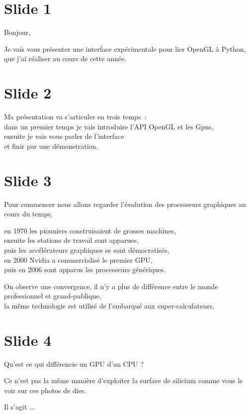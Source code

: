 \documentclass[12pt]{article}
\begin{document}
\section{Slide 1}

Bonjour, 

Je vais vous présenter une interface expérimentale pour lier OpenGL à Python, \\
que j'ai réaliser au cours de cette année.

\section{Slide 2}

Ma présentation va s'articuler en trois temps~: \\
  dans un premier temps je vais introduire l'API OpenGL et les Gpus, \\
  ensuite je vais vous parler de l'interface \\
  et finir par une démonstration.

\section{Slide 3}

Pour commencer nous allons regarder l'évolution des processeurs graphiques au cours du temps,

en 1970 les pionniers construisaient de grosses machines, \\
ensuite les stations de travail sont apparues, \\
puis les accélérateurs graphiques se sont démocratisés, \\
en 2000 Nvidia a commercialisé le premier GPU, \\
puis en 2006 sont apparus les processeurs génériques.

On observe une convergence, il n'y a plus de différence entre le monde professionnel et grand-publique, \\
la même technologie est utilisé de l'embarqué aux super-calculateurs.

\section{Slide 4}

Qu'est ce qui différencie un GPU d'un CPU ?

Ce n'est pas la même manière d'exploiter la surface de silicium comme vous le voir sur ces photos de
dies.

Il s'agit ...
\end{document}
